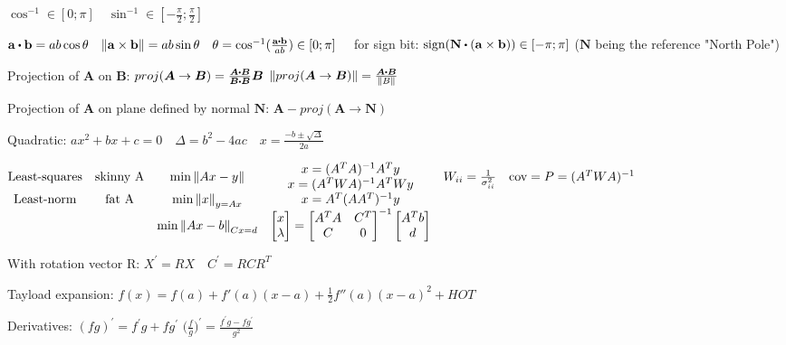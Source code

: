 \documentclass[11pt,landscape]{article}
\begin{document}
$
\cos^{-1} \in [0; \pi]
\quad
\sin^{-1} \in [-\frac{\pi}{2}; \frac{\pi}{2}]
$

$
\mathbf{a} \dotp \mathbf{b} = a b \cos{\theta}
\quad
\lVert \mathbf{a} \times \mathbf{b} \rVert = a b \sin{\theta}
\quad
\theta = \cos^{-1}({\frac{\mathbf{a} \dotp \mathbf{b}}{ab}}) \in [0; \pi]
\quad
$
for sign bit:
$
\text{sign}( \mathbf{N} \dotp (\mathbf{a} \times \mathbf{b})) \in [-\pi; \pi]
$
($\mathbf{N}$ being the reference "North Pole")

Projection of $\bm A$ on $\bm B$:
$proj(\bm A \rightarrow \bm B) = \frac{\bm A \dotp \bm B}{\bm B \dotp \bm B} \bm B$
\quad
$\norm{proj(\bm A \rightarrow \bm B)} = \frac{\bm A \dotp \bm B}{\norm{B}}$

Projection of $\bm A$ on plane defined by normal $\bm N$:
$\bm A - proj(\bm A \rightarrow \bm N)$

Quadratic:
$
ax^2 + bx + c = 0
\quad
\Delta = b^2 - 4ac
\quad
x = \frac{-b \pm \sqrt{\Delta}}{2a}
$

$
\begin{matrix}
\text{Least-squares} & \text{skinny A} & \text{min} \left\lVert Ax-y \right\rVert & 
	\begin{matrix} x = (A^TA)^{-1}A^Ty \\ x = (A^TWA)^{-1}A^TWy \end{matrix} &
	W_{ii}=\frac{1}{\sigma_{ii}^2} \quad \text{cov} = P = (A^TWA)^{-1} \\
\text{Least-norm} & \text{fat A} & \text{min} \left\lVert x \right\rVert_{y=Ax} & x = A^T(AA^T)^{-1}y \\
	&  & \text{min}\left\lVert Ax-b \right\rVert_{Cx=d} & 
	\begin{bmatrix} x \\ \lambda \end{bmatrix} =
	\begin{bmatrix} A^TA & C^T \\ C & 0 \end{bmatrix}^{-1}
	\begin{bmatrix} A^Tb \\ d \end{bmatrix}
\end{matrix}
$

With rotation vector R:
$X^\prime = RX \quad C^\prime = RCR^T$

Tayload expansion:
$
f(x) = f(a) + f'(a)(x-a) + \frac{1}{2}f''(a)(x-a)^2 + HOT
$

Derivatives:
$(fg)^\prime = f^\prime g + fg^\prime$
\quad
$\big( \frac{f}{g} \big)^\prime = \frac{f^\prime g - fg^\prime}{g^2}$
\end{document}
